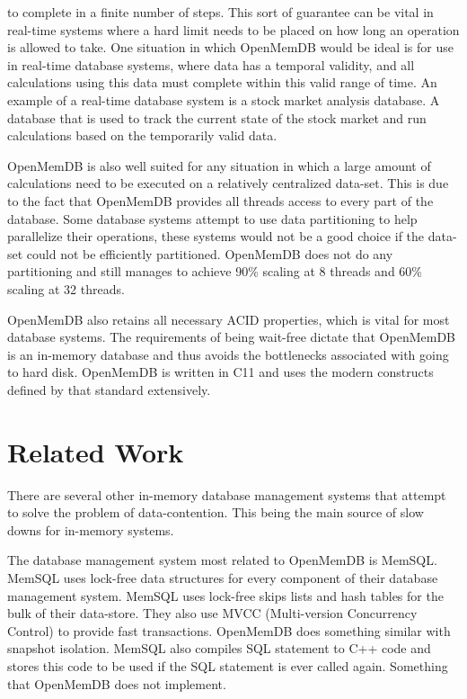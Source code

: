 \documentclass[conference, compsoc]{IEEEtran}
\newcommand{\CC}{C\nolinebreak\hspace{-.05em}\raisebox{.4ex}{\tiny\bf +}\nolinebreak\hspace{-.10em}\raisebox{.4ex}{\tiny\bf +}}
\begin{document}
to complete in a finite number of steps. This sort of guarantee can be vital in 
real-time systems where a hard limit needs to be placed on how long an operation 
is allowed to take. One situation in which OpenMemDB would be ideal is for use in real-time 
database systems, where data has a temporal validity, and all calculations using this data 
must complete within this valid range of time. An example of a real-time database system 
is a stock market analysis database. A database that is used to track the current state
of the stock market and run calculations based on the temporarily valid data. 
\par\vspace{\baselineskip}
OpenMemDB
is also well suited for any situation in which a large amount of calculations need to be 
executed on a relatively centralized data-set. This is due to the fact that OpenMemDB 
provides all threads access to every part of the database. Some database systems attempt to 
use data partitioning to help parallelize their operations, these systems would not be a 
good choice if the data-set could not be efficiently partitioned. OpenMemDB does not do any 
partitioning and still manages to achieve 90\% scaling at 8 threads and 60\% scaling at 32 
threads. 
\par\vspace{\baselineskip}
OpenMemDB also 
retains all necessary ACID properties, which is vital for most database systems. 
The requirements of being wait-free dictate that 
OpenMemDB is an in-memory database and thus avoids the bottlenecks associated with 
going to hard disk. OpenMemDB is written in \CC 11 and uses the modern constructs defined by 
that standard extensively.
\par\vspace{\baselineskip}

\section{Related Work}
There are several other in-memory database management systems that attempt to solve the 
problem of data-contention. This being the main source of slow downs for in-memory systems.

The database management system most related to OpenMemDB is MemSQL.
MemSQL uses lock-free data structures for every component of their database management
system. MemSQL uses lock-free skips lists and hash tables for the bulk of their data-store\cite{MemSQL}.
They also use MVCC (Multi-version Concurrency Control) to provide fast transactions. 
OpenMemDB does something similar with snapshot isolation. MemSQL also compiles SQL
statement to C++ code and stores this code to be used if the SQL statement is ever called
again. Something that OpenMemDB does not implement.
\end{document}
